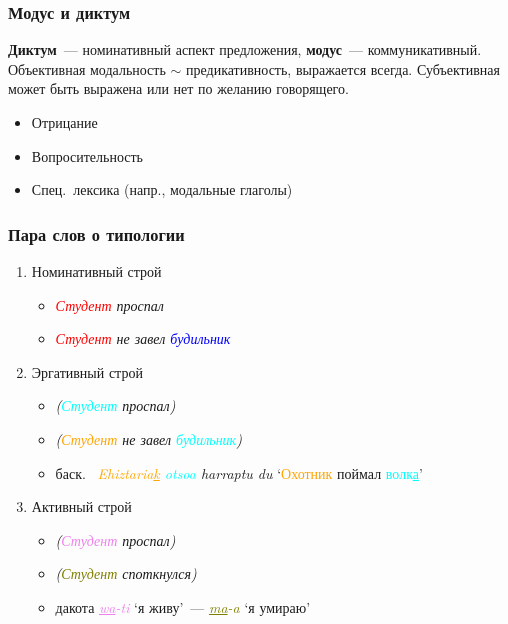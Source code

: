 \begin{frame}
  \frametitle{Модус и диктум}

  \textbf{Диктум}~--- номинативный аспект предложения, \textbf{модус}~--- коммуникативный.
  Объективная модальность $\sim$ предикативность, выражается всегда.
  Субъективная может быть выражена или нет по желанию говорящего.

  \vfill

  \begin{itemize}
    \item Отрицание
    \item Вопросительность
    \item Спец.\ лексика (напр., модальные глаголы)
  \end{itemize}
\end{frame}

\begin{frame}
  \frametitle{Пара слов о типологии}

  \begin{enumerate}
    \item Номинативный строй \begin{itemize}
      \item \textit{\textcolor{red}{Студент} проспал}
      \item \textit{\textcolor{red}{Студент} не завел \textcolor{blue}{будильник}}
    \end{itemize}

    \item<2-> Эргативный строй \begin{itemize}
      \item \textit{
        (\textcolor{cyan}{Студент} {\normalfont [фактитив]} проспал)
      }
      \item \textit{
        (\textcolor{orange}{Студент} {\normalfont [агентив]} не завел \textcolor{cyan}{будильник})
      }
      \item<3-> баск.\ \textit{
        \textcolor{orange}{Ehiztaria\underline{k}} \textcolor{cyan}{otsoa} harraptu du
      }
      `\textcolor{orange}{Охотник} поймал \textcolor{cyan}{волк\underline{а}}'
    \end{itemize}

    \item<4-> Активный строй \begin{itemize}
      \item \textit{(\textcolor{violet}{Студент} {\normalfont [актив]} проспал)}
      \item \textit{(\textcolor{olive}{Студент} {\normalfont [статив]} споткнулся)}
      \item<5-> дакота \textit{\textcolor{violet}{\underline{wa}-ti}} `я живу'~---
                \textit{\textcolor{olive}{\underline{ma}-a}} `я умираю'
    \end{itemize}
  \end{enumerate}
\end{frame}
